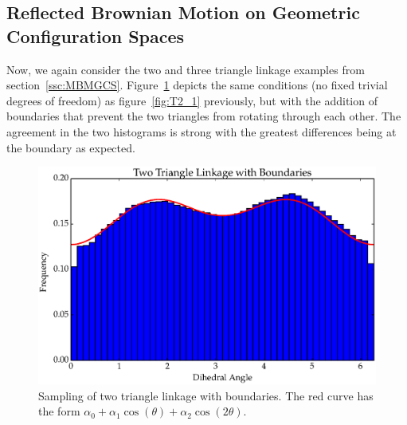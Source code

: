 \subsection{Reflected Brownian Motion on Geometric Configuration Spaces}
Now, we again consider the two and three triangle linkage examples from section~\ref{ssc:MBMGCS}. Figure~\ref{fig:T2_2} depicts the same conditions (no fixed trivial degrees of freedom) as figure~\ref{fig:T2_1} previously, but with the addition of boundaries that prevent the two triangles from rotating through each other. The agreement in the two histograms is strong with the greatest differences being at the boundary as expected. 
\begin{figure}[ht]
\centering
  \includegraphics[scale=0.6]{images/T2_2.eps}
\caption{Sampling of two triangle linkage with boundaries. The red curve has the form $\alpha_0 + \alpha_1\cos(\theta) + \alpha_2\cos(2\theta)$.}
\label{fig:T2_2}
\end{figure}

